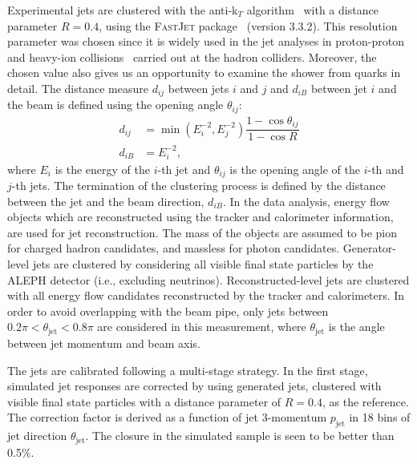 \documentclass[aps,preprint,superscriptaddress,groupedaddress]{revtex4}  %
\newcommand{\fastjet}{\textsc{FastJet}\xspace}
\newcommand{\fixme}[1]{{\color{red} [\textbf{#1}]}}
\begin{document}
Experimental jets are clustered with the anti-k$_T$ algorithm~\cite{Cacciari:2008gp} with a distance parameter $R = 0.4$, using the \fastjet package~\cite{Cacciari:2011ma} (version 3.3.2). This resolution parameter was chosen since it is widely used in the jet analyses in proton-proton and heavy-ion collisions~\cite{ATLAS:2012tjt,ATLAS:2018gwx,CMS:2021vui,CMS:2016uxf,Dokshitzer:1997in} carried out at the hadron colliders. Moreover, the chosen value also gives us an opportunity to examine the shower from quarks in detail. The distance measure $d_{ij}$ between jets $i$ and $j$ and $d_{iB}$ between jet $i$ and the beam is defined using the opening angle $\theta_{ij}$:
%
\begin{align}
    d_{ij} &= \min(E_i^{-2}, E_j^{-2}) \dfrac{1 - \cos\theta_{ij}}{1 - \cos R}\nonumber\\
    d_{iB} &= E_i^{-2},\nonumber
\end{align}
%
where $E_i$ is the energy of the $i$-th jet and $\theta_{ij}$ is the opening angle of the $i$-th and $j$-th jets.  The termination of the clustering process is defined by the distance between the jet and the beam direction, $d_{iB}$.
In the data analysis, energy flow objects which are reconstructed using the tracker and calorimeter information, are used for jet reconstruction.
The mass of the objects are assumed to be pion for charged hadron candidates, and massless for photon candidates.
Generator-level jets are clustered by considering all visible final state particles by the ALEPH detector (i.e., excluding neutrinos).  Reconstructed-level jets are clustered with all energy flow candidates reconstructed by the tracker and calorimeters. In order to avoid overlapping with the beam pipe, only jets between $0.2\pi < \theta_\text{jet} < 0.8\pi$ are considered in this measurement, where $\theta_\text{jet}$ is the angle between jet momentum and beam axis.

The jets are calibrated following a multi-stage strategy.  In the first stage, simulated jet responses are corrected by using generated jets, clustered with visible final state particles with a distance parameter of $R = 0.4$, as the reference.  The correction factor is derived as a function of jet 3-momentum $p_\text{jet}$ in 18 bins of jet direction $\theta_\text{jet}$.  The closure in the simulated sample is seen to be better than 0.5\%.%
\end{document}
